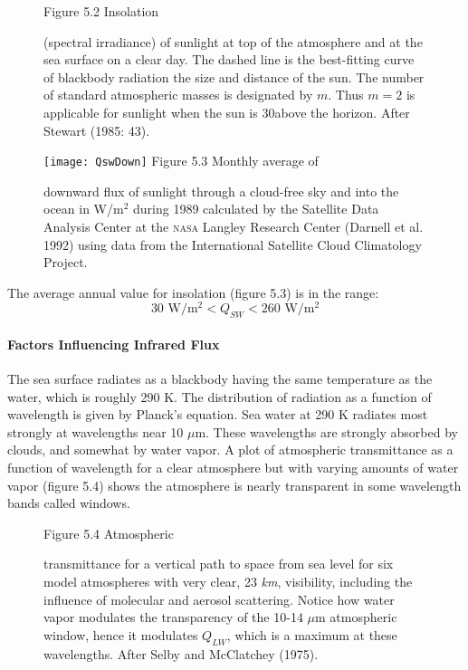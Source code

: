 \begin{figure}[t!]
\footnotesize
Figure 5.2 Insolation \rule{0pt}{3ex}(spectral
irradiance) of sunlight at top of the atmosphere and at the sea surface on a clear day. The
dashed line is the best-fitting curve of blackbody radiation the size and distance of the sun.
The number of standard atmospheric masses is designated by $m$. Thus $m = 2$ is
applicable for sunlight when the sun is 30\degrees above the
horizon. After Stewart (1985: 43).
\label{fig:insolation}
\vspace{-3ex}
\end{figure}

\begin{figure}[t!]
\texttt{[image: QswDown]}
\footnotesize
Figure 5.3 Monthly average of \rule{0pt}{3ex}downward flux of sunlight through a
cloud-free sky and into the ocean in W/m$^2$ during 1989 calculated
by the Satellite Data Analysis Center at the \textsc{nasa} Langley Research Center
(Darnell et al. 1992) using data from the International Satellite Cloud Climatology
Project.
\label{fig:QswDown}
\vspace{-3ex}
\end{figure}

The average annual value for insolation (figure 5.3) is in the
range:
\begin{equation}
30 \text{\ W/m$^2$} < Q_{SW} < 260 \text{\ W/m$^2$}
\end{equation}

\paragraph{Factors Influencing Infrared Flux}
The sea surface radiates as a blackbody having the
same temperature as the water, which is roughly 290 K. The distribution of radiation as
a function of wavelength is given by Planck's equation. Sea water at 290 K radiates
most strongly at wavelengths near 10 $\mu$m. These wavelengths are strongly
absorbed by clouds, and somewhat by water vapor. A plot of atmospheric
transmittance as a function of wavelength for a clear atmosphere but with varying
amounts of water vapor (figure 5.4) shows the atmosphere is nearly transparent
in some wavelength bands called windows.

\begin{figure}[t!]
\footnotesize
Figure 5.4 Atmospheric \rule{0pt}{3ex}transmittance for a vertical path to space
from sea level for six model atmospheres with very clear, 23 \textit{km},
visibility, including the influence of molecular and aerosol scattering. Notice
how water vapor modulates the transparency of the 10-14 $\mu$m atmospheric
window, hence it modulates $Q_{LW}$, which is a maximum at these wavelengths.
After Selby and McClatchey (1975).
\label{fig:transmittance}
\vspace{-3ex}
\end{figure}

